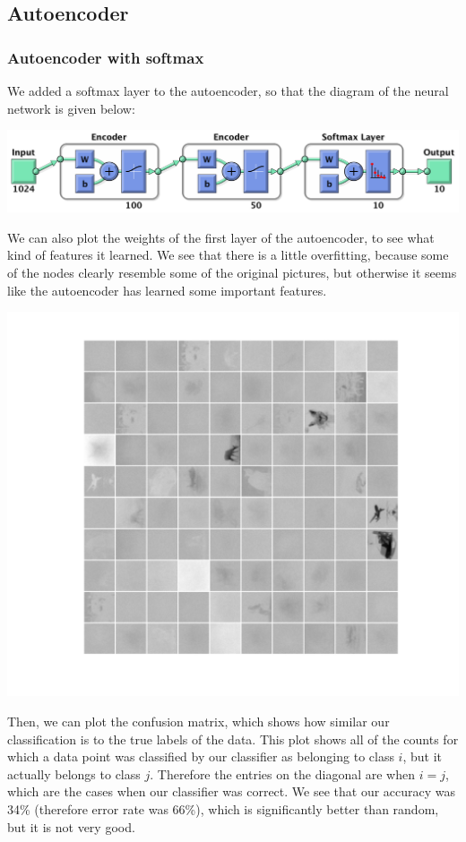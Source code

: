 \documentclass[11pt]{article}
\begin{document}
\subsection{Autoencoder}
\subsubsection{Autoencoder with softmax}
We added a softmax layer to the autoencoder, so that the diagram of the neural network is given below:
\begin{center}
\includegraphics[scale=0.6]{autoencoder.png} \\
\end{center}
We can also plot the weights of the first layer of the autoencoder, to see what kind of features it learned. We see that there is a little overfitting, because some of the nodes clearly resemble some of the original pictures, but otherwise it seems like the autoencoder has learned some important features.
\begin{center}
\includegraphics[scale=0.3,angle=270]{cifar-10-layer1weights.png} \\
\end{center}
Then, we can plot the confusion matrix, which shows how similar our classification is to the true labels of the data. This plot shows all of the counts for which a data point was classified by our classifier as belonging to class $i$, but it actually belongs to class $j$. Therefore the entries on the diagonal are when $i=j$, which are the cases when our classifier was correct. We see that our accuracy was 34\% (therefore error rate was 66\%), which is significantly better than random, but it is not very good.
\end{document}
